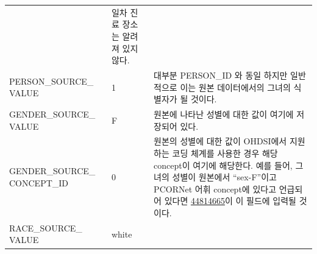 \documentclass[11pt]{book}
\theoremstyle{definition}
\theoremstyle{definition}
\theoremstyle{definition}
\theoremstyle{remark}
\begin{document}
\begin{longtable}[]{@{}lll@{}}
\begin{minipage}[t]{0.16\columnwidth}
\strut
\end{minipage} & \begin{minipage}[t]{0.48\columnwidth}\raggedright\strut
일차 진료 장소는 알려져 있지 않다.\strut
\end{minipage}\tabularnewline
\begin{minipage}[t]{0.28\columnwidth}\raggedright\strut
PERSON\_SOURCE\_ VALUE\strut
\end{minipage} & \begin{minipage}[t]{0.16\columnwidth}\raggedright\strut
1\strut
\end{minipage} & \begin{minipage}[t]{0.48\columnwidth}\raggedright\strut
대부분 PERSON\_ID 와 동일 하지만 일반적으로 이는 원본 데이터에서의
그녀의 식별자가 될 것이다.\strut
\end{minipage}\tabularnewline
\begin{minipage}[t]{0.28\columnwidth}\raggedright\strut
GENDER\_SOURCE\_ VALUE\strut
\end{minipage} & \begin{minipage}[t]{0.16\columnwidth}\raggedright\strut
F\strut
\end{minipage} & \begin{minipage}[t]{0.48\columnwidth}\raggedright\strut
원본에 나타난 성별에 대한 값이 여기에 저장되어 있다.\strut
\end{minipage}\tabularnewline
\begin{minipage}[t]{0.28\columnwidth}\raggedright\strut
GENDER\_SOURCE\_ CONCEPT\_ID\strut
\end{minipage} & \begin{minipage}[t]{0.16\columnwidth}\raggedright\strut
0\strut
\end{minipage} & \begin{minipage}[t]{0.48\columnwidth}\raggedright\strut
원본의 성별에 대한 값이 OHDSI에서 지원하는 코딩 체계를 사용한 경우 해당
concept이 여기에 해당한다. 예를 들어, 그녀의 성별이 원본에서
``sex-F''이고 PCORNet 어휘 concept에 있다고 언급되어 있다면
\href{http://athena.ohdsi.org/search-terms/terms/44814665}{44814665}이
이 필드에 입력될 것이다.\strut
\end{minipage}\tabularnewline
\begin{minipage}[t]{0.28\columnwidth}\raggedright\strut
RACE\_SOURCE\_ VALUE\strut
\end{minipage} & \begin{minipage}[t]{0.16\columnwidth}\raggedright\strut
white\strut
\end{minipage} & \begin{minipage}[t]{0.48\columnwidth}\raggedright\strut

\end{minipage}
\end{longtable}
\end{document}
